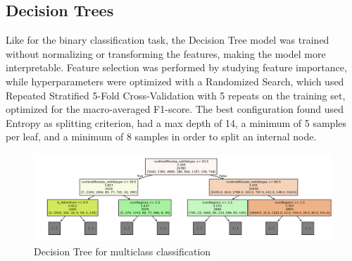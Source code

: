 \subsection{Decision Trees}
Like for the binary classification task, the Decision Tree model was trained without normalizing or
transforming the features, making the model more interpretable. Feature selection was performed by studying
feature importance, while hyperparameters were optimized with a Randomized Search,
which used Repeated Stratified 5-Fold Cross-Validation with 5 repeats on the training set, optimized for
the macro-averaged F1-score.
The best configuration found used Entropy as splitting criterion, had a max depth of 14, a minimum of
5 samples per leaf, and a minimum of 8 samples in order to split an internal node.
\begin{figure}[H]
    \centering
    \includegraphics[width=0.88\linewidth]{plots/multiclass_tree.png}
    \captionsetup{justification=centering, width=0.9\linewidth}
    \caption{Decision Tree for multiclass classification}
    \label{fig:multiclass_dt}
\end{figure}

